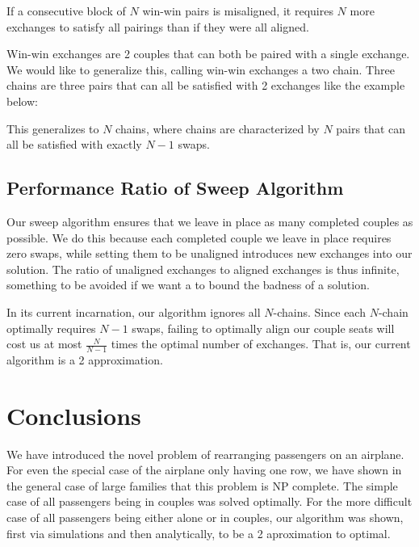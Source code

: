 \begin{cor} \label{cor:winWinAsBlocks}
If a consecutive block of $N$ win-win pairs is misaligned, it requires $N$ more exchanges to satisfy all pairings than if they were all aligned.
\end{cor}

Win-win exchanges are 2 couples that can both be paired with a single exchange.  We would like to generalize this, calling win-win exchanges a two chain.  Three chains are three pairs that can all be satisfied with 2 exchanges like the example below:

\begin{figure}[H]
\centering
{}
\end{figure}

This generalizes to $N$ chains, where chains are characterized by $N$ pairs that can all be satisfied with exactly $N-1$ swaps.

\subsection{Performance Ratio of Sweep Algorithm}

Our sweep algorithm ensures that we leave in place as many completed couples as possible. We do this because each completed couple we leave in place requires zero swaps, while setting them to be unaligned introduces new exchanges into our solution.  The ratio of unaligned exchanges to aligned exchanges is thus infinite, something to be avoided if we want a to bound the badness of a solution.

In its current incarnation, our algorithm ignores all $N$-chains.  Since each $N$-chain optimally requires $N-1$ swaps, failing to optimally align our couple seats will cost us at most $\frac{N}{N-1}$ times the optimal number of exchanges.  That is, our current algorithm is a 2 approximation.

\section{Conclusions}

We have introduced the novel problem of rearranging passengers on an airplane.  For even the special case of the airplane only having one row, we have shown in the general case of large families that this problem is NP complete.  The simple case of all passengers being in couples was solved optimally. For the more difficult case of all passengers being either alone or in couples, our algorithm was shown, first via simulations and then analytically, to be a 2 aproximation to optimal.

